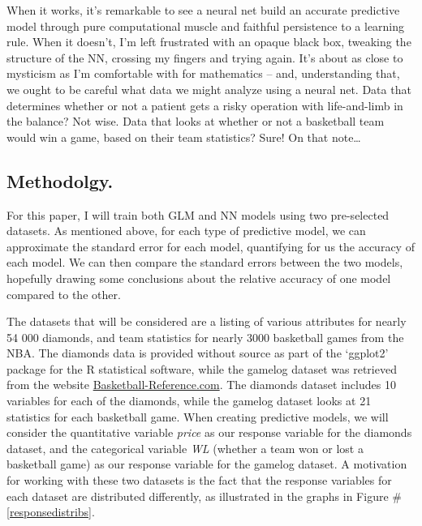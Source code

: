 \documentclass[12pt]{article}\usepackage[]{graphicx}\usepackage[]{color}
\begin{document}
When it works, it's remarkable to see a neural net build an accurate predictive model through pure computational muscle and faithful persistence to a learning rule.  When it doesn't, I'm left frustrated with an opaque black box, tweaking the structure of the NN, crossing my fingers and trying again.  It's about as close to mysticism as I'm comfortable with for mathematics -- and, understanding that, we ought to be careful what data we might analyze using a neural net.  Data that determines whether or not a patient gets a risky operation with life-and-limb in the balance?  Not wise.  Data that looks at whether or not a basketball team would win a game, based on their team statistics?  Sure!  On that note\dots


\subsection{Methodolgy.}

		For this paper, I will train both GLM and NN models using two pre-selected datasets.  As mentioned above, for each type of
predictive model, we can approximate the standard error for each model, quantifying for us the accuracy of each model.  We can then compare the 
standard errors between the two models, hopefully drawing some conclusions about the relative accuracy of one model compared to the other.

The datasets that will be considered are a listing of various attributes for nearly 54 000 diamonds, and team statistics for nearly 3000 
basketball games from the NBA.  The diamonds data is provided without source as part of the `ggplot2' package for the R statistical software, while
the gamelog dataset was retrieved from the website \href{https://www.basketball-reference.com}{Basketball-Reference.com}.  The diamonds dataset includes 
10 variables for each of the diamonds, while the gamelog dataset looks at 21 statistics for each basketball game.  When creating predictive models, we will 
consider the quantitative variable \textit{price} as our response variable for the diamonds dataset, and the categorical variable \textit{WL} (whether a team won 
or lost a basketball game) as our response variable for the gamelog dataset.  A motivation for working with these two datasets is the fact that the  
response variables for each dataset are distributed differently, as illustrated in the graphs in Figure \#\ref{responsedistribs}.
\end{document}
